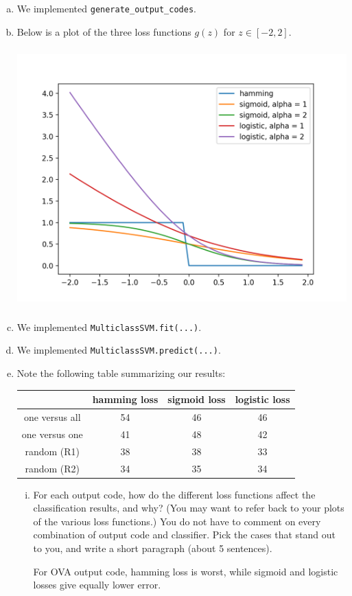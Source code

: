 \documentclass[11pt]{article}
\begin{document}
\begin{enumerate}[(a)]
	\item We implemented \verb+generate_output_codes+.
	\item Below is a plot of the three loss functions $g(z)$ for $z \in [-2, 2]$. 
\begin{center}
\includegraphics[width = 15cm, height = 10cm]{loss_funcs.png}
\end{center}
	\item We implemented \verb+MulticlassSVM.fit(...)+.
	\item We implemented \verb+MulticlassSVM.predict(...)+.
	\item Note the following table summarizing our results:
\begin{center}
\begin{tabular}{  c | c | c | c | } 
& hamming loss & sigmoid loss & logistic loss \\
\hline
one versus all & 54 & 46 & 46\\ 
\hline
one versus one & 41 & 48 & 42\\ 
\hline
random (R1) & 38 & 38 & 33\\ 
\hline
random (R2) & 34 & 35 & 34\\ 
\hline
\end{tabular}
\end{center}

\begin{enumerate}[i.]
	\item For each output code, how do the different loss functions affect the classification results, and why? (You may want to refer back to your plots of the various loss functions.) You do not have to comment on every combination of output code and classifier. Pick the cases that stand out to you, and write a short paragraph (about 5 sentences).

	For OVA output code, hamming loss is worst, while sigmoid and logistic losses give equally lower error. 

\end{enumerate}

\end{enumerate}
\end{document}
